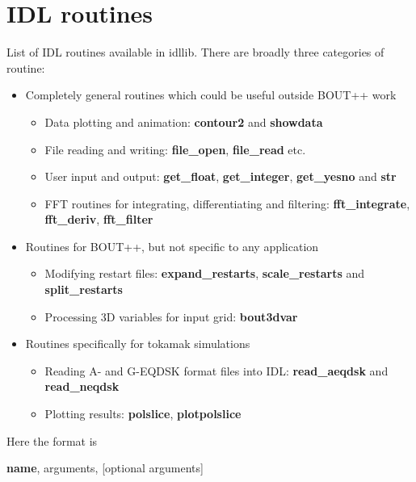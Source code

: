 \documentclass[12pt]{article}
\begin{document}
\section{IDL routines}
%
\label{apx:idl_routines}
%
List of IDL routines available in idllib. There are broadly three categories of
routine:
%
\begin{itemize}
\item Completely general routines which could be useful outside BOUT++ work
  \begin{itemize}
  \item Data plotting and animation: {\bf contour2} and {\bf showdata}
  \item File reading and writing: {\bf file\_open}, {\bf file\_read} etc.
  \item User input and output: {\bf get\_float}, {\bf get\_integer}, {\bf
      get\_yesno} and {\bf str}
  \item FFT routines for integrating, differentiating and filtering: {\bf fft\_integrate}, {\bf fft\_deriv}, {\bf fft\_filter}
  \end{itemize}
%
\item Routines for BOUT++, but not specific to any application
  \begin{itemize}
  \item Modifying restart files: {\bf expand\_restarts}, {\bf scale\_restarts}
      and {\bf split\_restarts}
  \item Processing 3D variables for input grid: {\bf bout3dvar}
  \end{itemize}
%
\item Routines specifically for tokamak simulations
  \begin{itemize}
  \item Reading A- and G-EQDSK format files into IDL: {\bf read\_aeqdsk} and
      {\bf read\_neqdsk}
  \item Plotting results: {\bf polslice}, {\bf plotpolslice}
  \end{itemize}
%
\end{itemize}
%
Here the format is

{\bf name}, arguments, [optional arguments]
\end{document}
